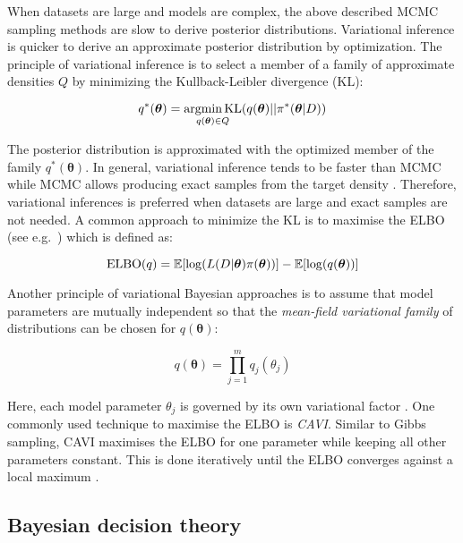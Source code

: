 When datasets are large and models are complex, the above described MCMC sampling methods are slow to derive posterior distributions. Variational inference is quicker to derive an approximate posterior distribution by optimization. The principle of variational inference is to select a member of a family of approximate densities $Q$ by minimizing the Kullback-Leibler divergence (KL):

\begin{equation}
q^\ast(\bm{\theta})=\underset{q(\bm{\theta})\in{}Q}{\textnormal{argmin\,{}KL}}(q(\bm{\theta})||\pi^*(\bm{\theta}|D))
\end{equation}

The posterior distribution is approximated with the optimized member of the family $q^\ast(\bm{\theta})$\citep{Blei2017}. In general, variational inference tends to be faster than MCMC while MCMC allows producing exact samples from the target density \citep{Blei2017}. Therefore, variational inferences is preferred when datasets are large and exact samples are not needed. A common approach to minimize the KL is to maximise the \gls{ELBO} (see e.g.~\citep{Beal2003}) which is defined as:

\begin{equation}
\textnormal{ELBO}(q)=\mathbb{E}[\log(L(D|\bm{\theta})\pi(\bm{\theta}))] - \mathbb{E}[\log(q(\bm{\theta}))]
\end{equation}

Another principle of variational Bayesian approaches is to assume that model parameters are mutually independent so that the \emph{mean-field variational family} of distributions can be chosen for $q(\bm{\theta})$:

\begin{equation}
q(\bm{\theta})=\prod_{j=1}^m{}q_j(\theta_j)
\end{equation}

Here, each model parameter $\theta_j$ is governed by its own variational factor \citep{Blei2017}. One commonly used technique to maximise the ELBO is \emph{\gls{CAVI}}. Similar to Gibbs sampling, CAVI maximises the ELBO for one parameter while keeping all other parameters constant. This is done iteratively until the ELBO converges against a local maximum \citep{Blei2017}. 

\subsection{Bayesian decision theory} \label{sec0:decision}

